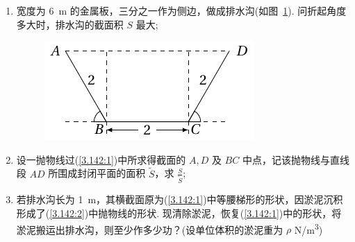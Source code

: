 	\begin{ti}
		\begin{enumerate}
			\item 宽度为 \SI{6}{m} 的金属板，三分之一作为侧边，做成排水沟(如图~\ref{fig:1.3.4}). 问折起角度多大时，排水沟的截面积 $S$ 最大;\label{3.142:1}
			\begin{figure}[htbp]
				\centering
				\includegraphics[scale=1]{figure/fig1-3-4.pdf}
				\caption{}\label{fig:1.3.4}
			\end{figure}
			\item 设一抛物线过(\ref{3.142:1})中所求得截面的 $A,D$ 及 $BC$ 中点，记该抛物线与直线段 $AD$ 所围成封闭平面的面积 $\widetilde{S}$，求 $\frac{S}{\widetilde{S}}$;\label{3.142:2}
			\item 若排水沟长为 \SI{1}{m}，其横截面原为(\ref{3.142:1})中等腰梯形的形状，因淤泥沉积形成了(\ref{3.142:2})中抛物线的形状. 现清除淤泥，恢复(\ref{3.142:1})中的形状，将淤泥搬运出排水沟，则至少作多少功？(设单位体积的淤泥重为 $\rho$ \si{N/m^3})
		\end{enumerate}
	\end{ti}